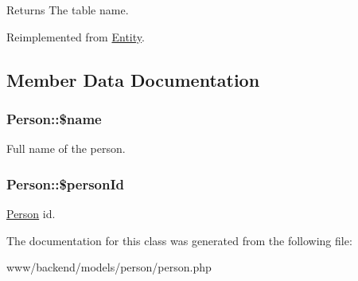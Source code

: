 \begin{DoxyReturn}{Returns}
The table name. 
\end{DoxyReturn}


Reimplemented from \hyperlink{classEntity_a8305fd94740ac62cbafb9de76567ce37}{Entity}.



\subsection{Member Data Documentation}
\hypertarget{classPerson_a311265986bee974f2812463c8e580887}{
\subsubsection[{\$name}]{\setlength{\rightskip}{0pt plus 5cm}Person::\$name}}
\label{classPerson_a311265986bee974f2812463c8e580887}
Full name of the person. \hypertarget{classPerson_aba3277526264a137afc631ec81e53810}{
\subsubsection[{\$personId}]{\setlength{\rightskip}{0pt plus 5cm}Person::\$personId}}
\label{classPerson_aba3277526264a137afc631ec81e53810}
\hyperlink{classPerson}{Person} id. 

The documentation for this class was generated from the following file:\begin{DoxyCompactItemize}
\item 
www/backend/models/person/person.php\end{DoxyCompactItemize}
